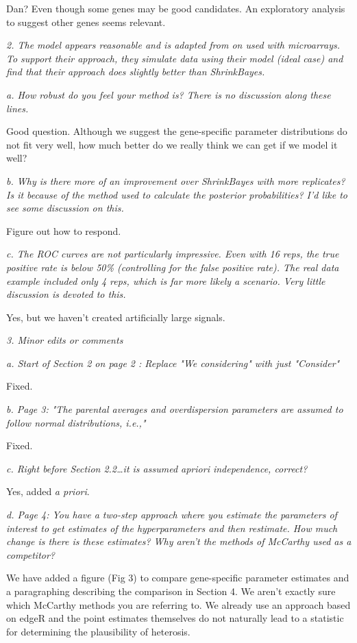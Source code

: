 \documentclass{article}
\newcommand{\comment}[1]{\textit{#1}}
\newcommand{\response}[1]{#1}
\newcommand{\todo}[1]{{\color{red} #1}}
\begin{document}
\todo{Dan? Even though some genes may be good candidates. An exploratory analysis to suggest other genes seems relevant.}

\comment{2. The model appears reasonable and is adapted from on used with microarrays.  To support their approach, they simulate data using their model (ideal case) and find that their approach does slightly better than ShrinkBayes.}

\comment{a. How robust do you feel your method is?  There is no discussion along these lines.}

\todo{Good question. Although we suggest the gene-specific parameter distributions do not fit very well, how much better do we really think we can get if we model it well?}

\comment{b.      Why is there more of an improvement over ShrinkBayes with more replicates?  Is it because of the method used to calculate the posterior probabilities?  I'd like to see some discussion on this.}

\todo{Figure out how to respond.}

\comment{c.      The ROC curves are not particularly impressive.  Even with 16 reps, the true positive rate is below 50\% (controlling for the false positive rate).  The real data example included only 4 reps, which is far more likely a scenario.  Very little discussion is devoted to this.}

\todo{Yes, but we haven't created artificially large signals.}

\comment{3.      Minor edits or comments}

\comment{a.      Start of Section 2 on page 2  :  Replace "We considering" with just "Consider"}

\response{Fixed.}

\comment{b.      Page 3: "The parental averages and overdispersion parameters are assumed to follow normal distributions, i.e.,"}

\response{Fixed.}

\comment{c.      Right before Section 2.2…it is assumed apriori independence, correct?}

\response{Yes, added \emph{a priori}.}

\comment{d.      Page 4: You have a two-step approach where you estimate the parameters of interest to get estimates of the hyperparameters and then restimate.  How much change is there is these estimates?  Why aren't the methods of McCarthy used as a competitor?}

\response{We have added a figure (Fig 3) to compare gene-specific parameter estimates and a paragraphing describing the comparison in Section 4. We aren't exactly sure which McCarthy methods you are referring to. We already use an approach based on edgeR and the point estimates themselves do not naturally lead to a statistic for determining the plausibility of heterosis.}
\end{document}
